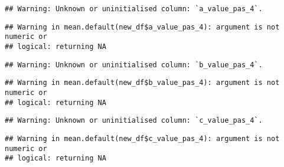 \documentclass[
]{article}
\newenvironment{Shaded}{\begin{snugshade}}{\end{snugshade}}
\newcommand{\FunctionTok}[1]{\textcolor[rgb]{0.00,0.00,0.00}{#1}}
\newcommand{\NormalTok}[1]{#1}
\newcommand{\OtherTok}[1]{\textcolor[rgb]{0.56,0.35,0.01}{#1}}
\newcommand{\SpecialCharTok}[1]{\textcolor[rgb]{0.00,0.00,0.00}{#1}}
\begin{document}
\begin{verbatim}
## Warning: Unknown or uninitialised column: `a_value_pas_4`.
\end{verbatim}

\begin{verbatim}
## Warning in mean.default(new_df$a_value_pas_4): argument is not numeric or
## logical: returning NA
\end{verbatim}

\begin{Shaded}
\end{Shaded}

\begin{verbatim}
## Warning: Unknown or uninitialised column: `b_value_pas_4`.
\end{verbatim}

\begin{verbatim}
## Warning in mean.default(new_df$b_value_pas_4): argument is not numeric or
## logical: returning NA
\end{verbatim}

\begin{Shaded}
\end{Shaded}

\begin{verbatim}
## Warning: Unknown or uninitialised column: `c_value_pas_4`.
\end{verbatim}

\begin{verbatim}
## Warning in mean.default(new_df$c_value_pas_4): argument is not numeric or
## logical: returning NA
\end{verbatim}

\begin{Shaded}
\end{Shaded}
\end{document}
